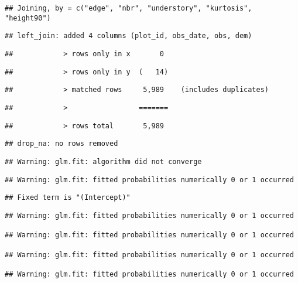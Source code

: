 \documentclass[
]{article}
\begin{document}
\begin{verbatim}
## Joining, by = c("edge", "nbr", "understory", "kurtosis", "height90")
\end{verbatim}

\begin{verbatim}
## left_join: added 4 columns (plot_id, obs_date, obs, dem)
\end{verbatim}

\begin{verbatim}
##            > rows only in x       0
\end{verbatim}

\begin{verbatim}
##            > rows only in y  (   14)
\end{verbatim}

\begin{verbatim}
##            > matched rows     5,989    (includes duplicates)
\end{verbatim}

\begin{verbatim}
##            >                 =======
\end{verbatim}

\begin{verbatim}
##            > rows total       5,989
\end{verbatim}

\begin{verbatim}
## drop_na: no rows removed
\end{verbatim}

\begin{verbatim}
## Warning: glm.fit: algorithm did not converge
\end{verbatim}

\begin{verbatim}
## Warning: glm.fit: fitted probabilities numerically 0 or 1 occurred
\end{verbatim}

\begin{verbatim}
## Fixed term is "(Intercept)"
\end{verbatim}

\begin{verbatim}
## Warning: glm.fit: fitted probabilities numerically 0 or 1 occurred

## Warning: glm.fit: fitted probabilities numerically 0 or 1 occurred

## Warning: glm.fit: fitted probabilities numerically 0 or 1 occurred

## Warning: glm.fit: fitted probabilities numerically 0 or 1 occurred
\end{verbatim}
\end{document}
